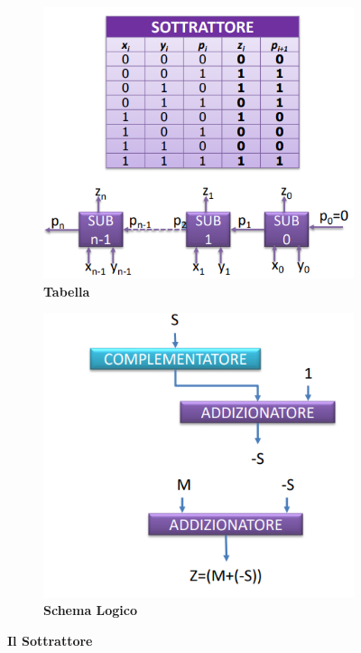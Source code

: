 \documentclass[12pt]{article} %
\begin{document}
\begin{figure}[h]
    \centering
    \begin{subfigure}[b]{0.40\textwidth}
        \centering
        \includegraphics[width=\textwidth]{Sottrattore.png}
        \caption{\textbf{Tabella}}
    \end{subfigure}
    \hfill %
    \begin{subfigure}{0.40\textwidth}
        \centering
        \includegraphics[width=\textwidth]{Schema.png}
        \caption{\textbf{Schema Logico}}
    \end{subfigure}
    \caption{\textbf{Il Sottrattore}}
    \label{fig:main}
\end{figure}
\end{document}

